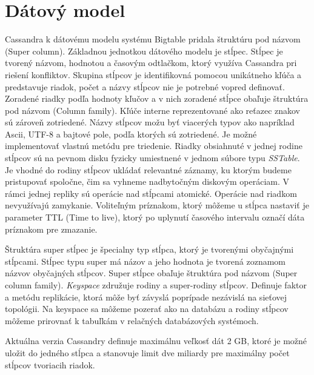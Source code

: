 \documentclass[11pt,twoside,a4paper]{book}
\begin{document}
\section{Dátový model}
Cassandra k dátovému modelu systému Bigtable pridala štruktúru pod názvom \emph{} (Super column). Základnou jednotkou dátového modelu je stĺpec. Stĺpec je tvorený názvom, hodnotou a časovým odtlačkom, ktorý využíva Cassandra pri riešení konfliktov. Skupina stĺpcov je identifikovná pomocou unikátneho kľúča a predstavuje riadok, počet a názvy stĺpcov nie je potrebné vopred definovať. Zoradené riadky podľa hodnoty kľučov a v nich zoradené stĺpce obaľuje štruktúra pod názvom  (Column family). Kľúče interne reprezentované ako reťazec znakov sú zároveň zotriedené. Názvy stĺpcov možu byť viacerých typov ako napríklad Ascii, UTF-8 a bajtové pole, podľa ktorých sú zotriedené. Je možné implementovať vlastnú metódu pre triedenie. Riadky obsiahnuté v jednej rodine stĺpcov sú na pevnom disku fyzicky umiestnené v jednom súbore typu \emph{SSTable}. Je vhodné do rodiny stĺpcov ukládať relevantné záznamy, ku ktorým budeme pristupovať spoločne, čim sa vyhneme nadbytočným diskovým operáciam. V rámci jednej repliky sú operácie nad stĺpcami atomické. Operácie nad riadkom nevyužívajú zamykanie. Voliteľným príznakom, ktorý môžeme u stĺpca nastaviť je parameter TTL (Time to live), ktorý po uplynutí časového intervalu označí dáta príznakom pre zmazanie.

Štruktúra super stĺpec je špecialny typ stĺpca, ktorý je tvorenými obyčajnými stĺpcami. Stĺpec typu super má názov a jeho hodnota je tvorená zoznamom názvov obyčajných stĺpcov. Super stĺpce obaľuje štruktúra pod názvom \emph{} (Super column family). \emph{Keyspace} združuje rodiny a super-rodiny stĺpcov. Definuje faktor a metódu replikácie, ktorá môže byť závyslá poprípade nezávislá na sieťovej topológii. Na keyspace sa môžeme pozerať ako na databázu a rodiny stĺpcov môžeme prirovnať k tabuľkám v relačných databázových systémoch.

Aktuálna verzia Cassandry definuje maximálnu veľkosť dát 2 GB, ktoré je možné uložit do jedného stĺpca a stanovuje limit dve miliardy pre maximálny počet stĺpcov tvoriacih riadok.

\end{document}
